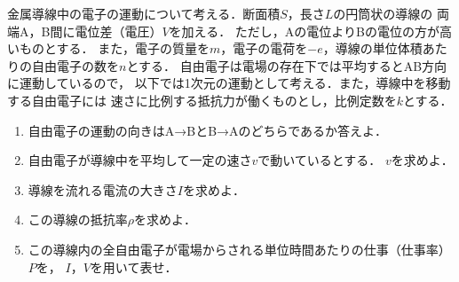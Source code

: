 \documentclass[../../../uem_phy_std_q.tex]{subfiles}
\begin{document}
    金属導線中の電子の運動について考える．断面積$S$，長さ$L$の円筒状の導線の%
    両端A，B間に電位差（電圧）$V$を加える．%
    ただし，Aの電位よりBの電位の方が高いものとする．%
    また，電子の質量を$m$，電子の電荷を$-e$，導線の単位体積あたりの自由電子の数を$n$とする．%
    自由電子は電場の存在下では平均するとAB方向に運動しているので，%
    以下では1次元の運動として考える．また，導線中を移動する自由電子には%
    速さに比例する抵抗力が働くものとし，比例定数を$k$とする．
    
    \begin{enumerate}
        \item%
            自由電子の運動の向きはA→BとB→Aのどちらであるか答えよ．
        \item%
            自由電子が導線中を平均して一定の速さ$v$で動いているとする．%
            $v$を求めよ．
        \item%
            導線を流れる電流の大きさ$I$を求めよ．
        \item%
            この導線の抵抗率$\rho$を求めよ．
        \item%
            この導線内の全自由電子が電場からされる単位時間あたりの仕事（仕事率）$P$を，%
            $I$，$V$を用いて表せ．
    \end{enumerate}
\end{document}
